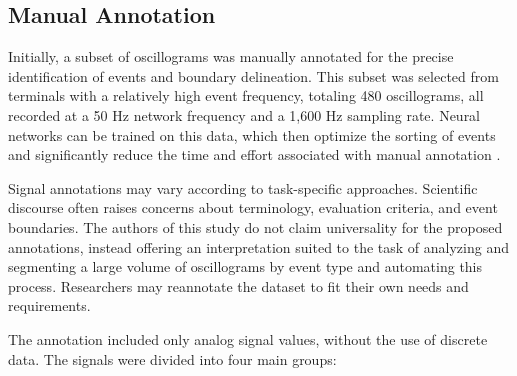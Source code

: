 \documentclass{article}
\begin{document}

\subsection*{Manual Annotation}

Initially, a subset of oscillograms was manually annotated for the precise identification of events and boundary delineation. This subset was selected from terminals with a relatively high event frequency, totaling 480 oscillograms, all recorded at a 50 Hz network frequency and a 1,600 Hz sampling rate. Neural networks can be trained on this data, which then optimize the sorting of events and significantly reduce the time and effort associated with manual annotation \cite{ml6}.

Signal annotations may vary according to task-specific approaches. Scientific discourse often raises concerns about terminology, evaluation criteria, and event boundaries. The authors of this study do not claim universality for the proposed annotations, instead offering an interpretation suited to the task of analyzing and segmenting a large volume of oscillograms by event type and automating this process. Researchers may reannotate the dataset to fit their own needs and requirements. 

The annotation included only analog signal values, without the use of discrete data. The signals were divided into four main groups:
\end{document}

